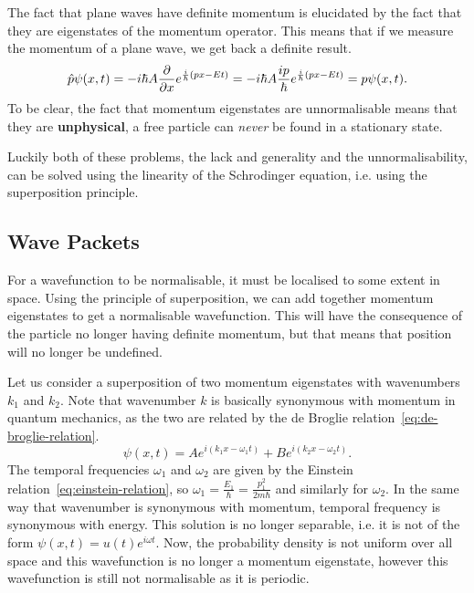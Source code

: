 \documentclass[../quantum_mechanics.tex]{subfiles}
\begin{document}
            The fact that plane waves have definite momentum is elucidated by the fact that they are eigenstates of the momentum operator.
            This means that if we measure the momentum of a plane wave, we get back a definite result.
            \begin{equation}
                \hat{p}\psi(x,t)=-i\hbar A\pdv{}{x}e^{\frac{i}{\hbar}(px-Et)}=-i\hbar A\frac{ip}{\hbar}e^{\frac{i}{\hbar}(px-Et)}=p\psi(x,t).
            \end{equation}
            To be clear, the fact that momentum eigenstates are unnormalisable means that they are \textbf{unphysical}, a free particle can \textit{never} be found in a stationary state.

            Luckily both of these problems, the lack and generality and the unnormalisability, can be solved using the linearity of the Schrodinger equation, i.e. using the superposition principle.

        \subsection{Wave Packets}\label{sec:free-particle:subsec:wave-packets}
            For a wavefunction to be normalisable, it must be localised to some extent in space.
            Using the principle of superposition, we can add together momentum eigenstates to get a normalisable wavefunction.
            This will have the consequence of the particle no longer having definite momentum, but that means that position will no longer be undefined.

            Let us consider a superposition of two momentum eigenstates with wavenumbers $k_1$ and $k_2$.
            Note that wavenumber $k$ is basically synonymous with momentum in quantum mechanics, as the two are related by the de Broglie relation~\ref{eq:de-broglie-relation}.
            \begin{equation}
                \psi(x,t)=Ae^{i(k_1x-\omega_1t)}+Be^{i(k_2x-\omega_2t)}.
            \end{equation}
            The temporal frequencies $\omega_1$ and $\omega_2$ are given by the Einstein relation~\ref{eq:einstein-relation}, so $\omega_1=\frac{E_1}{\hbar}=\frac{p_1^2}{2m\hbar}$ and similarly for $\omega_2$.
            In the same way that wavenumber is synonymous with momentum, temporal frequency is synonymous with energy.
            This solution is no longer separable, i.e. it is not of the form $\psi(x,t)=u(t)e^{i\omega t}$.
            Now, the probability density is not uniform over all space and this wavefunction is no longer a momentum eigenstate, however this wavefunction is still not normalisable as it is periodic.
            
\end{document}

